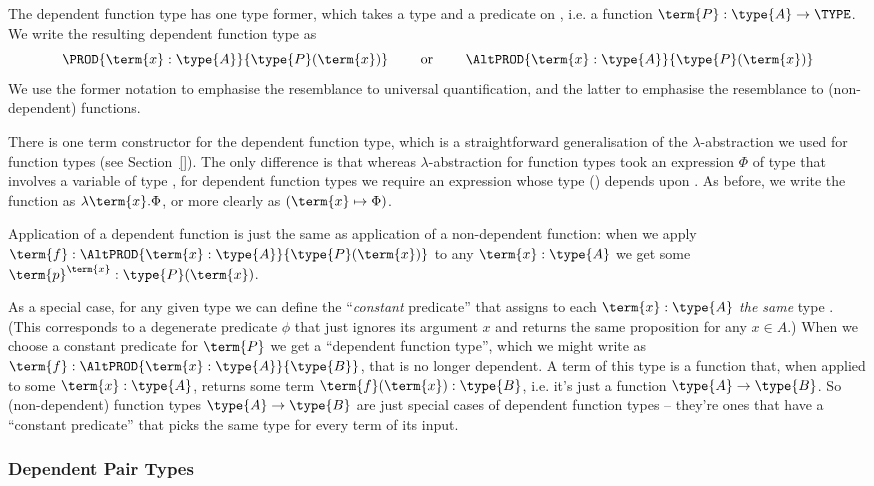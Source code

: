 The dependent function type 
has one type former, which takes a type  and a predicate on , i.e. a function $\term{P}:\type{A} \to \TYPE$.  We write the resulting dependent function type as
\[
\PROD{\term{x}:\type{A}}{\type{P}(\term{x})}
\quad\quad\mbox{ or }\quad\quad
\AltPROD{\term{x}:\type{A}}{\type{P}(\term{x})}
\]
We use the former notation to emphasise the resemblance to universal quantification, and the latter to emphasise the resemblance to (non-dependent) functions.

There is one term constructor for the dependent function type, which is a straightforward generalisation of the $\lambda$-abstraction
we used for function types (see Section~\ref{}).  The only difference is that whereas 
$\lambda$-abstraction for function types
took an expression $\Phi$ of type  that involves a variable  of type , 
for dependent function types we require an expression whose type () depends upon .  As before, we write the function as $\lambda \term{x} . \Phi$, or more clearly as $(\term{x} \mapsto \Phi)$.

Application of a dependent function is just the same as application of a non-dependent function: when we apply 
$\term{f}:\AltPROD{\term{x}:\type{A}}{\type{P}(\term{x})}$ 
to any $\term{x}:\type{A}$ 
we get some $\term{p}^{\term{x}}: \type{P}(\term{x})$.  

As a special case, for any given type  we can define the ``\emph{constant} predicate'' that assigns to each $\term{x}:\type{A}$ \emph{the same} type .  (This corresponds to a degenerate predicate $\phi$ that just ignores its argument $x$ and returns the same proposition for any $x \in A$.)
When we choose a constant predicate for $\term{P}$ we get a ``dependent function type'', which we might write as 
$\term{f}:\AltPROD{\term{x}:\type{A}}{\type{B}}$, 
that is no longer dependent.  A term of this type is a function that, when applied to some $\term{x}:\type{A}$, returns some term $\term{f}(\term{x}):\type{B}$, i.e. it's just a function $\type{A} \to \type{B}$.  So (non-dependent) function types $\type{A} \to \type{B}$ are just special cases of dependent function types -- they're ones that have a ``constant predicate'' that picks the same type  for every term of its input.







\newpage
\subsubsection{Dependent Pair Types}
\label{sec:Quantifiers-DependentPairTypes}

